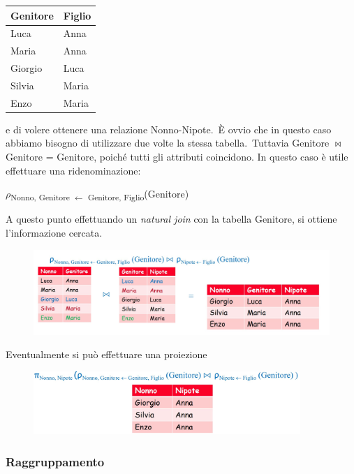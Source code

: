 \begin{table}[H]
	\centering
	\begin{tabular}{|l|l|}
		\hline
		\textbf{Genitore} & \textbf{Figlio} \\\hline\hline
		Luca              & Anna            \\\hline
		Maria             & Anna            \\\hline
		Giorgio           & Luca            \\\hline
		Silvia            & Maria           \\\hline
		Enzo              & Maria           \\\hline
	\end{tabular}
\end{table}
\noindent e di volere ottenere una relazione Nonno-Nipote.\
È ovvio che in questo caso abbiamo bisogno di utilizzare due volte la stessa tabella.\
Tuttavia Genitore $\Join$ Genitore = Genitore, poiché tutti gli attributi coincidono.
In questo caso è utile effettuare una ridenominazione:
\begin{center}
	$\rho$\textsubscript{Nonno, Genitore $\leftarrow$ Genitore, Figlio}(Genitore)
\end{center}
A questo punto effettuando un \textit{natural join} con la tabella Genitore, si ottiene l'informazione cercata.
\begin{figure}[H]
	\centering
	\includegraphics[width=\textwidth]{immagini/AR_SelfJoin.jpg}
\end{figure}
\noindent Eventualmente si può effettuare una proiezione
\begin{figure}[H]
	\centering
	\includegraphics[width=0.9\textwidth]{immagini/AR_SelfJoin2.jpg}
\end{figure}

\subsubsection{Raggruppamento}

